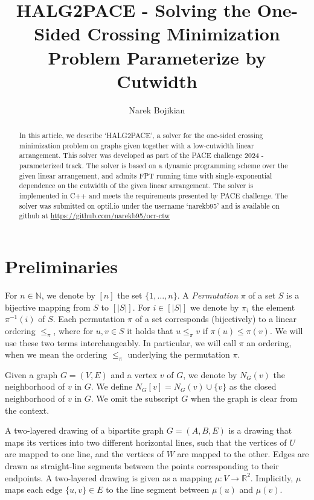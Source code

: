\documentclass[a4paper,UKenglish,cleveref, autoref, thm-restate]{lipics-v2021}
\title{HALG2PACE - Solving the One-Sided Crossing Minimization Problem Parameterize by Cutwidth} %
\author{Narek Bojikian}{Humboldt University of Berlin, Germany}{bojikian@informatik.hu-berlin.de}{https://orcid.org/0000-0003-1072-4873}{}%
\newcommand{\layerone}{\ensuremath{U}}
\newcommand{\layertwo}{\ensuremath{W}}
\begin{document}
\maketitle

\begin{abstract}
    In this article, we describe `HALG2PACE', a solver for the one-sided crossing minimization problem on graphs given together with a low-cutwidth linear arrangement. 
    This solver was developed as part of the PACE challenge 2024 - parameterized track. The solver is based on a dynamic programming scheme over the given linear arrangement, and admits FPT running time with single-exponential dependence on the cutwidth of the given linear arrangement. The solver is implemented in C++ and meets the requirements presented by PACE challenge. The solver was submitted on optil.io under the username `narekb95' and is available on github at \url{https://github.com/narekb95/ocr-ctw}
\end{abstract}
\section{Preliminaries}
For $n\in \mathbb{N}$, we denote by $[n]$ the set $\{1,\dots,n\}$.
A \emph{Permutation} $\pi$ of a set $S$ is a bijective mapping from $S$ to $[|S|]$. For $i\in[|S|]$ we denote by $\pi_i$ the element $\pi^{-1}(i)$ of $S$. Each permutation $\pi$ of a set corresponds (bijectively) to a linear ordering $\leq_{\pi}$, where for $u,v\in S$ it holds that $u\leq_{\pi} v$ if $\pi(u)\leq \pi(v)$. We will use these two terms interchangeably. In particular, we will call $\pi$ an ordering, when we mean the ordering $\leq_{\pi}$ underlying the permutation $\pi$.

Given a graph $G = (V,E)$ and a vertex $v$ of $G$, we denote by $N_G(v)$ the neighborhood of $v$ in $G$. We define $N_G[v] = N_G(v)\cup \{v\}$ as the closed neighborhood of $v$ in $G$. We omit the subscript $G$ when the graph is clear from the context.

A two-layered drawing of a bipartite graph $G=(A,B,E)$ is a drawing that maps its vertices into two different horizontal lines, such that the vertices of $\layerone$ are mapped to one line, and the vertices of $\layertwo$ are mapped to the other. Edges are drawn as straight-line segments between the points corresponding to their endpoints. A two-layered drawing is given as a mapping $\mu\colon V\rightarrow \mathbb{R}^2$. Implicitly, $\mu$ maps each edge $\{u,v\} \in E$ to the line segment between $\mu(u)$ and $\mu(v)$.
\end{document}
